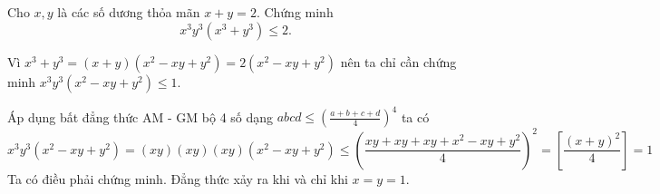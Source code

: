 \begin{problem}
	Cho $x, y$ là các số dương thỏa mãn $x + y = 2$. Chứng minh 
	\[
		x^3y^3(x^3 + y^3) \le 2.
	\]
	\solution

	Vì $x^3 + y^3 = (x + y)(x^2 - xy + y^2) = 2(x^2 - xy + y^2)$ nên ta chỉ cần chứng minh $x^3y^3(x^2 - xy + y^2) \le 1$.

	Áp dụng bất đẳng thức AM - GM bộ 4 số dạng $\displaystyle abcd \le \left(\frac{a + b + c + d}{4}\right)^4$ ta có
	\[
		x^3y^3(x^2 - xy + y^2) = (xy)(xy)(xy)(x^2 - xy + y^2) \le \left(\frac{xy + xy + xy + x^2 - xy + y^2}{4}\right)^2 = \left[\frac{(x + y)^2}{4}\right] = 1
	\]
	Ta có điều phải chứng minh. Đẳng thức xảy ra khi và chỉ khi $x = y = 1$.
\end{problem}